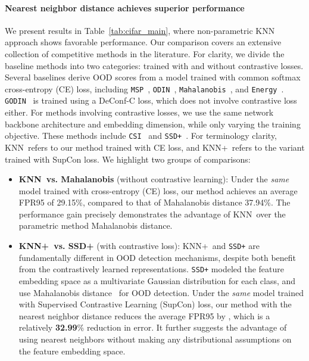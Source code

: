 \documentclass[nohyperref]{article}
\newcommand{\method}{{KNN}}
\newcommand{\methodplus}{{KNN+}}
\theoremstyle{plain}
\theoremstyle{definition}
\theoremstyle{remark}
\begin{document}
\paragraph{Nearest neighbor distance achieves superior performance}
We present results in Table~\ref{tab:cifar_main}, where non-parametric KNN approach shows favorable performance. Our comparison covers an extensive collection of competitive methods in the literature. For clarity, we divide the baseline methods into two categories: trained with and without contrastive losses. Several baselines derive OOD scores from a model trained with common softmax cross-entropy (CE) loss, including \texttt{MSP}~\citep{Kevin}, \texttt{ODIN}~\citep{liang2018enhancing}, \texttt{Mahalanobis}~\citep{lee2018simple}, and \texttt{Energy}~\citep{liu2020energy}. \texttt{GODIN}~\citep{hsu2020generalized} is trained using a DeConf-C loss, which does not involve contrastive loss either. 
For methods involving contrastive losses, we use the same network backbone architecture and embedding dimension, while only varying the training objective. These methods include 
\texttt{CSI}~\citep{tack2020csi} and
\texttt{SSD+}~\citep{2021ssd}. For terminology clarity, \method~refers to our method trained with CE loss, and \methodplus~refers to the variant trained with SupCon loss. We highlight two groups of comparisons: 
\begin{itemize}
\vspace{-0.2cm}
\item \textbf{\method~vs. Mahalanobis} (without contrastive learning): Under the \emph{same} model trained with cross-entropy (CE) loss, our method achieves an average FPR95 of 29.15\%, compared to that of Mahalanobis distance 37.94\%. The performance gain precisely demonstrates the advantage of \method~over the parametric method Mahalanobis distance.
\vspace{-0.2cm}
\item \textbf{\methodplus~vs. SSD+} (with contrastive loss):   \methodplus~and \texttt{SSD+}  are fundamentally different in OOD detection mechanisms, despite both benefit from the contrastively learned representations.  \texttt{SSD+} modeled the feature embedding space as a multivariate Gaussian distribution for each class, and use Mahalanobis distance~\cite{lee2018simple} for OOD detection. Under the \emph{same} model trained with Supervised Contrastive Learning (SupCon) loss, our method with the nearest neighbor distance reduces the average FPR95 by , which is a relatively \textbf{32.99}\% reduction in error. It further suggests the advantage of using nearest neighbors without making any distributional assumptions on the feature embedding space.  

\end{itemize}
\end{document}

